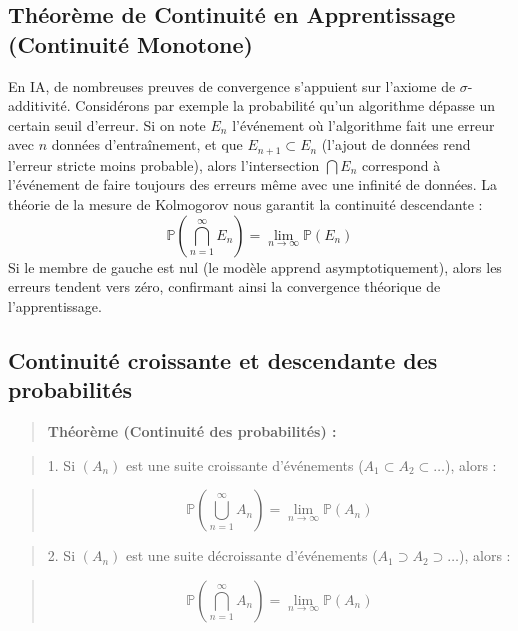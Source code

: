\documentclass[11pt,a4paper]{article}
\begin{document}
\subsection{Théorème de Continuité en Apprentissage (Continuité Monotone)}

En IA, de nombreuses preuves de convergence s'appuient sur l'axiome de $\sigma$-additivité. Considérons par exemple la probabilité qu'un algorithme dépasse un certain seuil d'erreur. Si on note $E_n$ l'événement où l'algorithme fait une erreur avec $n$ données d'entraînement, et que $E_{n+1} \subset E_n$ (l'ajout de données rend l'erreur stricte moins probable), alors l'intersection $\bigcap E_n$ correspond à l'événement de faire toujours des erreurs même avec une infinité de données. La théorie de la mesure de Kolmogorov nous garantit la continuité descendante :
$$ \mathbb{P}\left(\bigcap_{n=1}^\infty E_n\right) = \lim_{n \to \infty} \mathbb{P}(E_n) $$
Si le membre de gauche est nul (le modèle apprend asymptotiquement), alors les erreurs tendent vers zéro, confirmant ainsi la convergence théorique de l'apprentissage.

\subsection{Continuité croissante et descendante des probabilités}

\begin{quote}\textbf{Théorème (Continuité des probabilités) :}\end{quote}
\begin{quote}1. Si $(A_n)$ est une suite croissante d'événements ($A_1 \subset A_2 \subset \dots$), alors :\end{quote}
\begin{quote}$$ \mathbb{P}\left(\bigcup_{n=1}^\infty A_n\right) = \lim_{n \to \infty} \mathbb{P}(A_n) $$\end{quote}
\begin{quote}2. Si $(A_n)$ est une suite décroissante d'événements ($A_1 \supset A_2 \supset \dots$), alors :\end{quote}
\begin{quote}$$ \mathbb{P}\left(\bigcap_{n=1}^\infty A_n\right) = \lim_{n \to \infty} \mathbb{P}(A_n) $$\end{quote}
\end{document}
